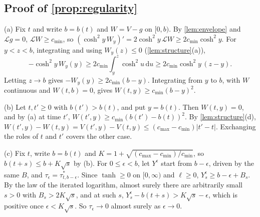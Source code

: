 \documentclass[11pt]{article}
\theoremstyle{definition}
\theoremstyle{remark}
\newcommand{\dd}{\,\mathrm{d}}
\newcommand{\Lop}{\mathcal{L}}
\begin{document}
\subsection{Proof of \texorpdfstring{\cref{prop:regularity}}{Proposition }}

(a) Fix $t$ and write $b = b(t)$ and $W = V - g$ on $[0, b)$. By \cref{lem:envelope} and
$\Lop g = 0$, $\Lop W \ge c_{\min}$, so $(\cosh^2 y\,W_y)' = 2\cosh^2 y\,\Lop W \ge 2c_{\min}\cosh^2 y$.
For $y < z < b$, integrating and using $W_y(z) \le 0$ (\cref{lem:structure}(a)),
\begin{equation}
  -\cosh^2 y\,W_y(y) \ge 2c_{\min}\int_y^z \cosh^2 u\dd u \ge 2c_{\min}\cosh^2 y\,(z - y).
\end{equation}
Letting $z \to b$ gives $-W_y(y) \ge 2c_{\min}(b - y)$. Integrating from $y$ to $b$, with $W$
continuous and $W(t, b) = 0$, gives $W(t, y) \ge c_{\min}(b - y)^2$.

(b) Let $t, t' \ge 0$ with $b(t') > b(t)$, and put $y = b(t)$. Then $W(t, y) = 0$, and by (a) at
time $t'$, $W(t', y) \ge c_{\min}(b(t') - b(t))^2$. By \cref{lem:structure}(d),
$W(t', y) - W(t, y) = V(t', y) - V(t, y) \le (c_{\max} - c_{\min})|t' - t|$. Exchanging the roles of $t$ and
$t'$ covers the other case.

(c) Fix $t$, write $b = b(t)$ and $K = 1 + \sqrt{(c_{\max} - c_{\min})/c_{\min}}$, so
$b(t+s) \le b + K\sqrt s$ by (b). For $0 \le \epsilon < b$, let $Y^\epsilon$ start from $b - \epsilon$, driven by the same
$B$, and $\tau_\epsilon = \tau^*_{t, b - \epsilon}$. Since $\tanh \ge 0$ on $[0, \infty)$ and
$\ell \ge 0$, $Y^\epsilon_s \ge b - \epsilon + B_s$. By the law of the iterated logarithm, almost
surely there are arbitrarily small $s > 0$ with $B_s > 2K\sqrt s$, and at such $s$,
$Y^\epsilon_s - b(t+s) > K\sqrt s - \epsilon$, which is positive once $\epsilon < K\sqrt s$. So
$\tau_\epsilon \to 0$ almost surely as $\epsilon \to 0$.
\end{document}

